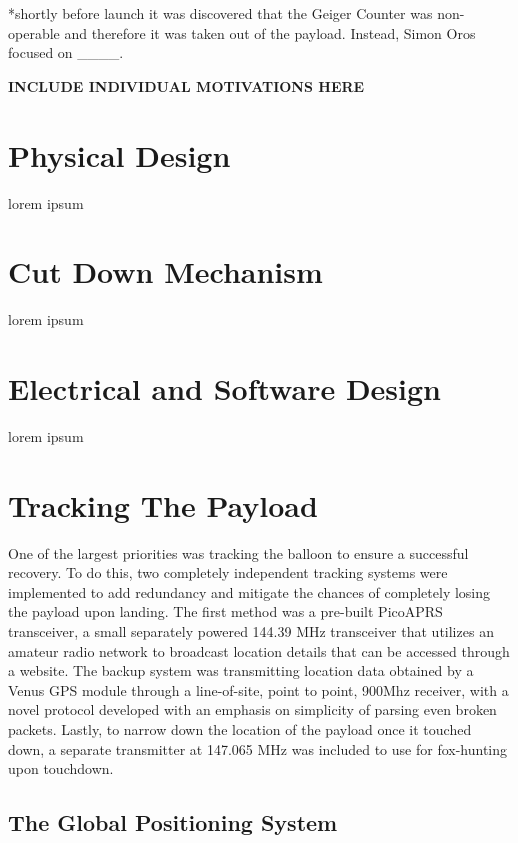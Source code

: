 \documentclass[12pt,]{article}
\begin{document}
*shortly before launch it was discovered that the Geiger Counter was
non-operable and therefore it was taken out of the payload. Instead,
Simon Oros focused on \_\_\_\_.

\textbf{INCLUDE INDIVIDUAL MOTIVATIONS HERE}

\section{Physical Design}\label{physical-design}

lorem ipsum

\section{Cut Down Mechanism}\label{cut-down-mechanism}

lorem ipsum

\section{Electrical and Software
Design}\label{electrical-and-software-design}

lorem ipsum

\section{Tracking The Payload}\label{tracking-the-payload}

One of the largest priorities was tracking the balloon to ensure a
successful recovery. To do this, two completely independent tracking
systems were implemented to add redundancy and mitigate the chances of
completely losing the payload upon landing. The first method was a
pre-built PicoAPRS transceiver, a small separately powered 144.39 MHz
transceiver that utilizes an amateur radio network to broadcast location
details that can be accessed through a website. The backup system was
transmitting location data obtained by a Venus GPS module through a
line-of-site, point to point, 900Mhz receiver, with a novel protocol
developed with an emphasis on simplicity of parsing even broken packets.
Lastly, to narrow down the location of the payload once it touched down,
a separate transmitter at 147.065 MHz was included to use for
fox-hunting upon touchdown.

\subsection{The Global Positioning
System}\label{the-global-positioning-system}
\end{document}
